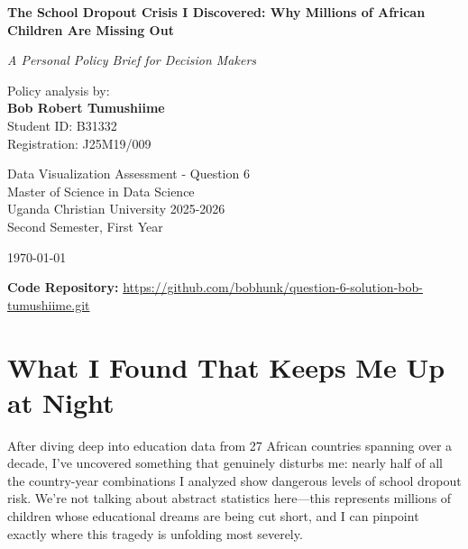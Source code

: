 \documentclass[12pt,a4paper]{article}
\begin{document}
\begin{titlepage}
\centering
\vspace*{2cm}

{\LARGE\bfseries The School Dropout Crisis I Discovered: Why Millions of African Children Are Missing Out}

\vspace{1cm}

{\large\textit{A Personal Policy Brief for Decision Makers}}

\vspace{2cm}

{\large Policy analysis by:}\\
\vspace{0.5cm}
{\Large\bfseries Bob Robert Tumushiime}\\
\vspace{0.5cm}
{\large Student ID: B31332}\\
{\large Registration: J25M19/009}

\vspace{3cm}

{\large Data Visualization Assessment - Question 6}\\
{\large Master of Science in Data Science}\\
{\large Uganda Christian University 2025-2026}\\
{\large Second Semester, First Year}

\vspace{2cm}

{\large \today}

\end{titlepage}

\noindent\textbf{Code Repository:} \url{https://github.com/bobhunk/question-6-solution-bob-tumushiime.git}
\vspace{0.5cm}

\newpage
\tableofcontents
\newpage

\section{What I Found That Keeps Me Up at Night}

After diving deep into education data from 27 African countries spanning over a decade, I've uncovered something that genuinely disturbs me: nearly half of all the country-year combinations I analyzed show dangerous levels of school dropout risk. We're not talking about abstract statistics here---this represents millions of children whose educational dreams are being cut short, and I can pinpoint exactly where this tragedy is unfolding most severely.
\end{document}
